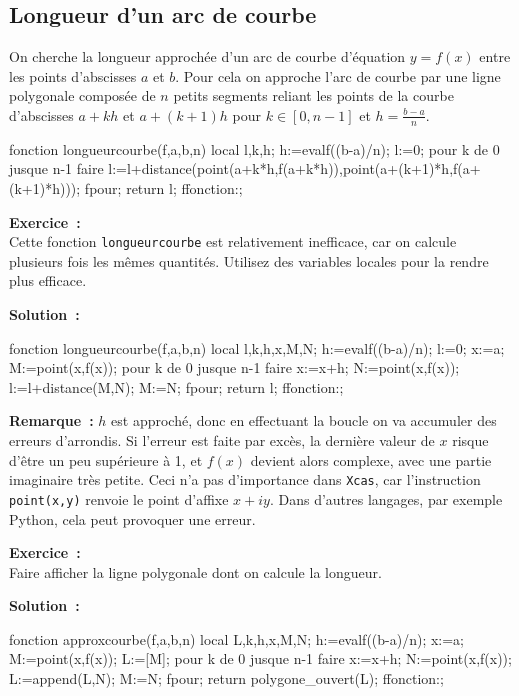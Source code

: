 \documentclass[12pt,a4paper]{book}
\begin{document}
\begin{giacjshere}
\section{Longueur d'un arc de courbe}
On cherche la longueur approch\'ee d'un arc de courbe d'\'equation
$y=f(x)$ entre les points d'abscisses $a$ et $b$. Pour cela
on approche l'arc de courbe par une ligne polygonale compos\'ee
de $n$ petits segments reliant les points de la courbe d'abscisses $a+kh$ 
et $a+(k+1)h$ pour $k \in [0,n-1]$ et $h=\frac{b-a}{n}$.
\begin{giaconload}
fonction longueurcourbe(f,a,b,n)
  local l,k,h;
  h:=evalf((b-a)/n);
  l:=0;
  pour k de 0 jusque n-1 faire
    l:=l+distance(point(a+k*h,f(a+k*h)),point(a+(k+1)*h,f(a+(k+1)*h)));
  fpour;
  return l;
ffonction:;
\end{giaconload}

{\bf Exercice~:} \\
Cette fonction {\tt longueurcourbe} est relativement inefficace, car on calcule 
plusieurs fois les m\^emes quantit\'es. Utilisez des variables locales
pour la rendre plus efficace.

{\bf Solution~:}
\begin{giacprog}
fonction longueurcourbe(f,a,b,n)
  local l,k,h,x,M,N;
  h:=evalf((b-a)/n);
  l:=0;
  x:=a;
  M:=point(x,f(x));
  pour k de 0 jusque n-1 faire
    x:=x+h;
    N:=point(x,f(x));
    l:=l+distance(M,N);
    M:=N;
  fpour;
  return l;
ffonction:;
\end{giacprog}

{\bf Remarque~:} $h$ est approch\'e, donc en effectuant la boucle on
va accumuler des erreurs d'arrondis. Si l'erreur est faite par
exc\`es, la derni\`ere valeur de $x$ risque d'\^etre un peu 
sup\'erieure \`a 1, et $f(x)$ devient alors complexe, avec
une partie imaginaire tr\`es petite. Ceci n'a pas d'importance
dans {\tt Xcas}, car l'instruction \verb|point(x,y)| renvoie
le point d'affixe $x+iy$. Dans d'autres langages, par exemple Python,
cela peut provoquer une erreur.

{\bf Exercice~:} \\
Faire afficher la ligne polygonale dont on calcule la longueur.

{\bf Solution~:}
\begin{giacprog}
fonction approxcourbe(f,a,b,n)
  local L,k,h,x,M,N;
  h:=evalf((b-a)/n);
  x:=a;
  M:=point(x,f(x));
  L:=[M];
  pour k de 0 jusque n-1 faire
    x:=x+h;
    N:=point(x,f(x));
    L:=append(L,N);
    M:=N;
  fpour;
  return polygone_ouvert(L);
ffonction:;
\end{giacprog}


\end{giacjshere}
\end{document}
